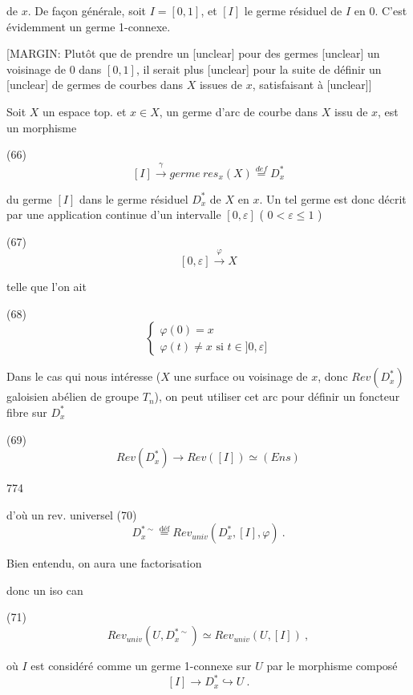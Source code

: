 \newpage


de $x$. De façon générale, soit $I = [0,1]$, et
$[I]$ le germe résiduel de $I$ en $0$. C'est
évidemment un germe 1-connexe.

[MARGIN: Plutôt que de prendre un [unclear] pour des germes [unclear] un voisinage de $0$ dans $[0,1]$, il serait plus [unclear] pour la suite de définir un [unclear] de germes de courbes dans $X$ issues de $x$, satisfaisant à [unclear]]

Soit $X$ un espace top. et $x \in X$, un
germe d'arc de courbe dans
$X$ issu de $x$, est un morphisme

(66) $$[I] \xrightarrow{\gamma} germe \ res_x (X) \overset{def}{=} D_x^*$$

du germe $[I]$ dans le germe résiduel $D_x^*$ de
$X$ en $x$. Un tel germe est donc décrit
par une application continue d'un
intervalle $[0, \varepsilon]$ ( $0 < \varepsilon \le 1$ )

(67) $$[0, \varepsilon] \xrightarrow{\varphi} X$$

telle que l'on ait

(68) $$\begin{cases} \varphi(0) = x \\ \varphi(t) \neq x \text{ si } t \in ]0, \varepsilon] \end{cases}$$

Dans le cas qui nous intéresse ($X$
une surface ou voisinage de $x$, donc
$Rev(D_x^*)$ galoisien abélien de groupe $T_n$),
on peut utiliser cet arc pour définir
un foncteur fibre sur $D_x^*$

(69) $$Rev(D_x^*) \to Rev([I]) \simeq (Ens)$$

\newpage


774

d'où un rev. universel
(70) $$D_x^{*\sim} \overset{\text{déf}}{=} Rev_{univ}(D_x^*, [I], \varphi) \ .$$

Bien entendu, on aura une factorisation


donc un iso can

(71) $$Rev_{univ}(U, D_x^{*\sim}) \simeq Rev_{univ}(U, [I]) \ ,$$

où $I$ est considéré comme un germe
1-connexe sur $U$ par le morphisme composé
$$[I] \longrightarrow D_x^* \hookrightarrow U \ .$$

